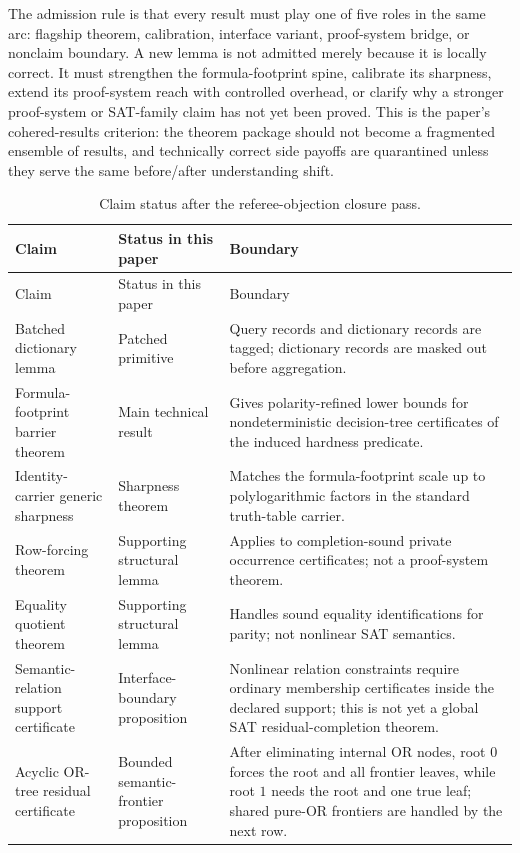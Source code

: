 \documentclass[11pt]{article}
\theoremstyle{definition}
\begin{document}
The admission rule is that every result must play one of five roles in the same arc: flagship theorem, calibration, interface variant, proof-system bridge, or nonclaim boundary.  A new lemma is not admitted merely because it is locally correct.  It must strengthen the formula-footprint spine, calibrate its sharpness, extend its proof-system reach with controlled overhead, or clarify why a stronger proof-system or SAT-family claim has not yet been proved.  This is the paper's cohered-results criterion: the theorem package should not become a fragmented ensemble of results, and technically correct side payoffs are quarantined unless they serve the same before/after understanding shift.

{\scriptsize
\begin{longtable}{@{}p{}p{}p{}@{}}
\caption{Claim status after the referee-objection closure pass.}
\label{tab:theorem-status}\\
\toprule
Claim & Status in this paper & Boundary \\
\midrule
\endfirsthead
\toprule
Claim & Status in this paper & Boundary \\
\midrule
\endhead
Batched dictionary lemma & Patched primitive & Query records and dictionary records are tagged; dictionary records are masked out before aggregation. \\
Formula-footprint barrier theorem & Main technical result & Gives polarity-refined lower bounds for nondeterministic decision-tree certificates of the induced hardness predicate. \\
Identity-carrier generic sharpness & Sharpness theorem & Matches the formula-footprint scale up to polylogarithmic factors in the standard truth-table carrier. \\
Row-forcing theorem & Supporting structural lemma & Applies to completion-sound private occurrence certificates; not a proof-system theorem. \\
Equality quotient theorem & Supporting structural lemma & Handles sound equality identifications for parity; not nonlinear SAT semantics. \\
Semantic-relation support certificate & Interface-boundary proposition & Nonlinear relation constraints require ordinary membership certificates inside the declared support; this is not yet a global SAT residual-completion theorem. \\
Acyclic OR-tree residual certificate & Bounded semantic-frontier proposition & After eliminating internal OR nodes, root \(0\) forces the root and all frontier leaves, while root \(1\) needs the root and one true leaf; shared pure-OR frontiers are handled by the next row. \\

\end{longtable}}
\end{document}
